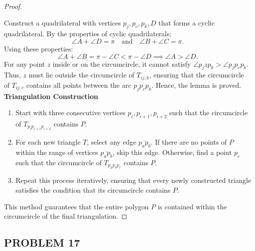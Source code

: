 \documentclass{article}
\begin{document}
\begin{proof}
\begin{figure}[h]
        \label{fig:q2_proof}
    \end{figure}
    Construct a quadrilateral with vertices \( p_j, p_c, p_k, D \) that forms a cyclic quadrilateral. By the properties of cyclic quadrilaterals:
    \[
        \angle A + \angle D = \pi \quad \text{and} \quad \angle B + \angle C = \pi.
    \]
    Using these properties:
    \[
        \angle A + \angle B = \pi - \angle C < \pi - \angle D \implies \angle A > \angle D.
    \]
    For any point \( z \) inside or on the circumcircle, it cannot satisfy \( \angle p_j z p_k > \angle p_j p_c p_k \). Thus, \( z \) must lie outside the circumcircle of \( T_{ij,k} \), ensuring that the circumcircle of \( T_{ij,c} \) contains all points between the arc \( p_j p_c p_k \). Hence, the lemma is proved.
    \\
    \textbf{Triangulation Construction}
    \begin{enumerate}
        \item Start with three consecutive vertices \( p_i, p_{i+1}, p_{i+2} \) such that the circumcircle of \( T_{p_i p_{i+1} p_{i+2}} \) contains \( P \).
        \item For each new triangle \( T \), select any edge \( \overline{p_a p_b} \). If there are no points of \( P \) within the range of vertices \( \overline{p_a p_b} \), skip this edge. Otherwise, find a point \( p_c \) such that the circumcircle of \( T_{p_a p_b p_c} \) contains \( P \).
        \item Repeat this process iteratively, ensuring that every newly constructed triangle satisfies the condition that its circumcircle contains \( P \).
    \end{enumerate}
        
    This method guarantees that the entire polygon \( P \) is contained within the circumcircle of the final triangulation.
\end{proof}

\newpage

\subsection*{PROBLEM 17}
\end{document}
